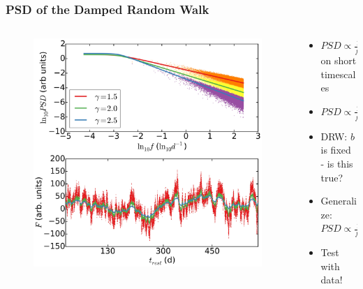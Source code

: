 \documentclass[hyperref={pdfpagelabels=false}]{beamer}
\begin{document}
\begin{frame}
\frametitle{PSD of the Damped Random Walk}
  \begin{columns}
    \centering
    \begin{column}{0.5\textwidth}
    \centering
      \begin{figure}
        \includegraphics[scale=0.09]{images/DRW.jpg}
      \end{figure}
    \end{column}
    \begin{column}{0.5\textwidth}
    \begin{itemize}
    \item $PSD \propto \frac{1}{f^{2}}$ on short timescales
    \item $PSD \propto \frac{1}{f^{b}} \Rightarrow \sigma_{\alpha-fluc} \propto r^{b}$ {\tiny \citep{Lyubarskii97}}
    \item DRW: $b$ is fixed - is this true?
    \item Generalize: $PSD \propto \frac{1}{f^{\gamma}}$ {\tiny \citep{McHardy04}}
    \item Test with data!
    \end{itemize}
    \end{column}
  \end{columns}
\end{frame}
\end{document}
